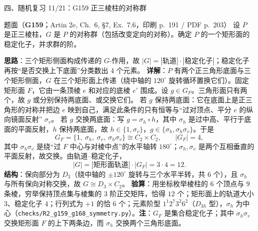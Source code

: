 \documentclass[aspectratio=169,10pt,fontset=none]{ctexbeamer}
\newcommand{\ex}[1]{\textcolor{accent}{\footnotesize\bfseries #1}}
\newcommand{\key}[1]{\textcolor{ink}{\bfseries #1}}
\begin{document}
\begin{frame}[t]{四、随机复习 11/21：G159 正三棱柱的对称群}
\label{ex:G159}
\scriptsize
\begin{block}{\footnotesize 题面（\ex{G159}；Artin 2e, Ch.~6, §7, Ex.~7.6，印刷 p.~191 / PDF p.~203）}
设 $P$ 是正三棱柱，$G$ 是 $P$ 的对称群（包括改变定向的对称）。确定 $P$ 的一个矩形面的稳定化子，并求群的阶。
\end{block}
\key{思路}：三个矩形侧面构成传递的 $G$-作用，故 $|G|=|\text{轨道}|\cdot|\text{稳定化子}|$；稳定化子再按“是否交换上下底面”分类数出 4 个元素。
\key{详解}：$P$ 有两个正三角形底面与三个矩形侧面，$G$ 在三个矩形面上传递（绕中轴的 $120^\circ$ 旋转循环置换它们）。固定矩形面 $F$，它由一条顶棱 $e$ 和对应的底棱 $e'$ 围成。设 $g\in G_F$。三角形面只有两个，故 $g$ 或分别保持两底面、或交换它们。
若 $g$ 保持两底面：它在底面上是正三角形的对称并把边 $e$ 映到自己，满足此条件的只有恒等与“过对顶点、平分 $e$ 的纵向镜面反射” $\sigma_v$。
若 $g$ 交换两底面：写 $g=\sigma_h\circ h$，其中 $\sigma_h$ 是过中高、平行于底面的平面反射，$h$ 保持两底面，故 $h\in\{1,\sigma_v\}$，$g\in\{\sigma_h,\sigma_h\sigma_v\}$。于是
\[ G_F=\{1,\ \sigma_h,\ \sigma_v,\ \sigma_h\sigma_v\}\cong C_2\times C_2,\qquad |G_F|=4, \]
其中 $\sigma_h\sigma_v$ 是绕“过 $F$ 中心与对棱中点”的水平轴转 $180^\circ$；$\sigma_h,\sigma_v$ 是两个互相垂直的平面反射，故交换。由轨道–稳定化子，
\[ |G|=|\text{矩形面轨道}|\cdot|G_F|=3\cdot4=12. \]
\key{结构}：保向部分为 $D_3$（绕中轴的 $\pm120^\circ$ 旋转与三个水平半转，共 $6$ 个），且 $\sigma_h$ 与所有保向对称交换，故 $G\cong D_3\times C_2$。
\key{验算}：用坐标枚举棱柱的 $6$ 个顶点与 $9$ 条棱，穷举保持顶点集与棱集的 $3$ 阶正交矩阵，恰得 $12$ 个；矩形面上的轨道大小 $3$、稳定化子 $4$；行列式为 $+1$ 的恰 $6$ 个；元素阶型 $1^1 2^7 3^2 6^2$（$D_{3h}$ 型），$\sigma_h$ 为中心（\texttt{checks/R2\_g159\_g168\_symmetry.py}）。\key{注}：$G_F$ 是集合稳定化子；其中 $\sigma_h\sigma_v$ 交换矩形面 $F$ 的上下两条边，而 $\sigma_h$ 交换两个三角形底面。
\end{frame}
\end{document}
